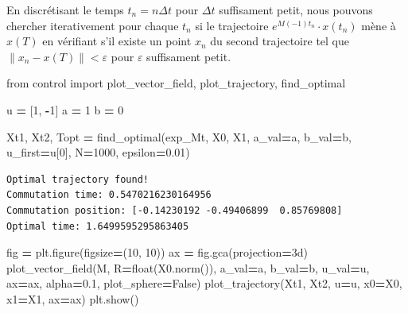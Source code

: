 \documentclass[
  french,
]{article}
\newenvironment{Shaded}{\begin{snugshade}}{\end{snugshade}}
\newcommand{\BuiltInTok}[1]{#1}
\newcommand{\DecValTok}[1]{\textcolor[rgb]{0.00,0.00,0.81}{#1}}
\newcommand{\FloatTok}[1]{\textcolor[rgb]{0.00,0.00,0.81}{#1}}
\newcommand{\ImportTok}[1]{#1}
\newcommand{\NormalTok}[1]{#1}
\newcommand{\OperatorTok}[1]{\textcolor[rgb]{0.81,0.36,0.00}{\textbf{#1}}}
\newcommand{\StringTok}[1]{\textcolor[rgb]{0.31,0.60,0.02}{#1}}
\newcommand{\VariableTok}[1]{\textcolor[rgb]{0.00,0.00,0.00}{#1}}
\begin{document}
En discrétisant le temps \(t_n=n\Delta t\) pour \(\Delta t\)
suffisament petit, nous pouvons chercher iterativement pour
chaque \(t_n\) si le trajectoire \(e^{M(-1)t_n}\cdot x(t_n)\)
mène à \(x(T)\) en vérifiant s'il existe un point \(x_n\)
du second trajectoire tel que \(\left\lVert x_n-x(T)\right\rVert<\varepsilon\)
pour \(\varepsilon\) suffisament petit.

\begin{Shaded}
\begin{Highlighting}[]
\ImportTok{from}\NormalTok{ control }\ImportTok{import}\NormalTok{ plot\_vector\_field, plot\_trajectory, find\_optimal}

\NormalTok{u }\OperatorTok{=}\NormalTok{ [}\DecValTok{1}\NormalTok{, }\OperatorTok{{-}}\DecValTok{1}\NormalTok{]}
\NormalTok{a }\OperatorTok{=} \DecValTok{1}
\NormalTok{b }\OperatorTok{=} \DecValTok{0}

\NormalTok{Xt1, Xt2, Topt }\OperatorTok{=}\NormalTok{ find\_optimal(exp\_Mt, X0, X1, a\_val}\OperatorTok{=}\NormalTok{a, b\_val}\OperatorTok{=}\NormalTok{b, u\_first}\OperatorTok{=}\NormalTok{u[}\DecValTok{0}\NormalTok{], N}\OperatorTok{=}\DecValTok{1000}\NormalTok{, epsilon}\OperatorTok{=}\FloatTok{0.01}\NormalTok{)}
\end{Highlighting}
\end{Shaded}

\begin{verbatim}
Optimal trajectory found!
Commutation time: 0.5470216230164956
Commutation position: [-0.14230192 -0.49406899  0.85769808]
Optimal time: 1.6499595295863405
\end{verbatim}

\begin{Shaded}
\begin{Highlighting}[]
\NormalTok{fig }\OperatorTok{=}\NormalTok{ plt.figure(figsize}\OperatorTok{=}\NormalTok{(}\DecValTok{10}\NormalTok{, }\DecValTok{10}\NormalTok{))}
\NormalTok{ax }\OperatorTok{=}\NormalTok{ fig.gca(projection}\OperatorTok{=}\StringTok{\textquotesingle{}3d\textquotesingle{}}\NormalTok{)}
\NormalTok{plot\_vector\_field(M, R}\OperatorTok{=}\BuiltInTok{float}\NormalTok{(X0.norm()), a\_val}\OperatorTok{=}\NormalTok{a, b\_val}\OperatorTok{=}\NormalTok{b, u\_val}\OperatorTok{=}\NormalTok{u, ax}\OperatorTok{=}\NormalTok{ax, alpha}\OperatorTok{=}\FloatTok{0.1}\NormalTok{, plot\_sphere}\OperatorTok{=}\VariableTok{False}\NormalTok{)}
\NormalTok{plot\_trajectory(Xt1, Xt2, u}\OperatorTok{=}\NormalTok{u, x0}\OperatorTok{=}\NormalTok{X0, x1}\OperatorTok{=}\NormalTok{X1, ax}\OperatorTok{=}\NormalTok{ax)}
\NormalTok{plt.show()}
\end{Highlighting}
\end{Shaded}
\end{document}
